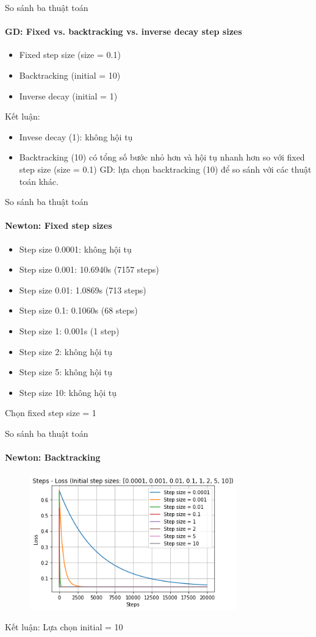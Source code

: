 \documentclass[10pt]{beamer}
\theoremstyle{remark}
\theoremstyle{definition}
\begin{document}
\begin{frame}{So sánh ba thuật toán}
	\framesubtitle{GD: Fixed vs. backtracking vs. inverse decay step sizes}
	\begin{itemize}
		\item Fixed step size (size = 0.1)
		\item Backtracking (initial = 10)
		\item Inverse decay (initial = 1)

	\end{itemize}
	Kết luận:
	\begin{itemize}
		\item Invese decay (1): không hội tụ
		\item Backtracking (10) có tổng số bước nhỏ hơn và hội tụ nhanh hơn so với fixed step size (size = 0.1)
		GD: lựa chọn backtracking (10) để so sánh với các thuật toán khác.
	\end{itemize}
\end{frame}

\begin{frame}{So sánh ba thuật toán}
	\framesubtitle{Newton: Fixed step sizes}
	\begin{itemize}
		\item Step size 0.0001: không hội tụ
		\item Step size 0.001: 10.6940s (7157 steps)
		\item Step size 0.01: 1.0869s (713 steps)
		\item Step size 0.1: 0.1060s (68 steps)
		\item Step size 1: 0.001s (1 step)
		\item Step size 2: không hội tụ
		\item Step size 5: không hội tụ
		\item Step size 10: không hội tụ

	\end{itemize}
	Chọn fixed step size = 1 
\end{frame}

\begin{frame}{So sánh ba thuật toán}
	\framesubtitle{Newton: Backtracking}
	\begin{figure}[h!]
		\centering
		\includegraphics[width=9cm]{Thinh/12.png}
	\end{figure}
	Kết luận: Lựa chọn initial = 10
\end{frame}
\end{document}
